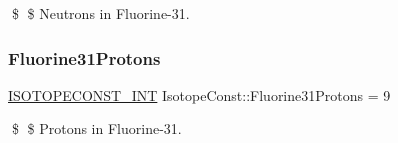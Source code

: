 \$ \$ Neutrons in Fluorine-\/31. \mbox{\label{group___isotope_const-_fluorine-_f31_gae2a4677b2cb1f6eb358e94be98151d31}} 
\subsubsection{\texorpdfstring{Fluorine31\+Protons}{Fluorine31Protons}}
{\footnotesize\ttfamily \mbox{\hyperlink{group___isotope_const-_macros_ga5f18360b3e99483a35c32d789e62621c}{I\+S\+O\+T\+O\+P\+E\+C\+O\+N\+S\+T\+\_\+\+I\+NT}} Isotope\+Const\+::\+Fluorine31\+Protons = 9}

\$ \$ Protons in Fluorine-\/31. 